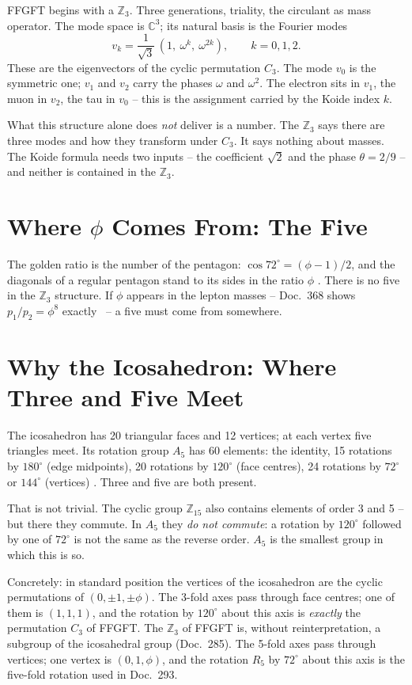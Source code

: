 FFGFT begins with a $\mathbb{Z}_3$. Three generations, triality, the circulant
as mass operator. The mode space is $\mathbb{C}^3$; its natural basis is the
Fourier modes
\[
  v_k = \frac{1}{\sqrt3}\,(1,\ \omega^k,\ \omega^{2k}), \qquad k = 0,1,2.
\]
These are the eigenvectors of the cyclic permutation $C_3$. The mode $v_0$ is
the symmetric one; $v_1$ and $v_2$ carry the phases $\omega$ and $\omega^2$. The
electron sits in $v_1$, the muon in $v_2$, the tau in $v_0$ -- this is the
assignment carried by the Koide index $k$.

What this structure alone does \emph{not} deliver is a number. The
$\mathbb{Z}_3$ says there are three modes and how they transform under $C_3$. It
says nothing about masses. The Koide formula needs two inputs -- the coefficient
$\sqrt2$ and the phase $\theta = 2/9$ -- and neither is contained in the
$\mathbb{Z}_3$.

\section{Where $\phi$ Comes From: The Five}

The golden ratio is the number of the pentagon: $\cos 72^\circ = (\phi-1)/2$,
and the diagonals of a regular pentagon stand to its sides in the ratio $\phi$
\EM. There is no five in the $\mathbb{Z}_3$ structure. If $\phi$ appears in the
lepton masses -- Doc.~368 shows $p_1/p_2 = \phi^8$ exactly \BM~-- a five must
come from somewhere.

\section{Why the Icosahedron: Where Three and Five Meet}

The icosahedron has 20 triangular faces and 12 vertices; at each vertex five
triangles meet. Its rotation group $A_5$ has 60 elements: the identity, 15
rotations by $180^\circ$ (edge midpoints), 20 rotations by $120^\circ$ (face
centres), 24 rotations by $72^\circ$ or $144^\circ$ (vertices) \EM. Three and
five are both present.

That is not trivial. The cyclic group $\mathbb{Z}_{15}$ also contains elements
of order 3 and 5 -- but there they commute. In $A_5$ they \emph{do not
commute}: a rotation by $120^\circ$ followed by one of $72^\circ$ is not the same
as the reverse order. $A_5$ is the smallest group in which this is so.

Concretely: in standard position the vertices of the icosahedron are the cyclic
permutations of $(0,\pm1,\pm\phi)$. The 3-fold axes pass through face centres;
one of them is $(1,1,1)$, and the rotation by $120^\circ$ about this axis is
\emph{exactly} the permutation $C_3$ of FFGFT. The $\mathbb{Z}_3$ of FFGFT is,
without reinterpretation, a subgroup of the icosahedral group (Doc.~285). The
5-fold axes pass through vertices; one vertex is $(0,1,\phi)$, and the rotation
$R_5$ by $72^\circ$ about this axis is the five-fold rotation used in Doc.~293.


